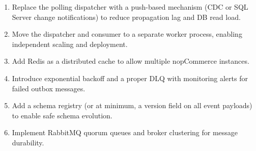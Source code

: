 \begin{enumerate}
    \item Replace the polling dispatcher with a push-based mechanism (CDC or SQL Server change notifications) to reduce propagation lag and DB read load.
    \item Move the dispatcher and consumer to a separate worker process, enabling independent scaling and deployment.
    \item Add Redis as a distributed cache to allow multiple nopCommerce instances.
    \item Introduce exponential backoff and a proper DLQ with monitoring alerts for failed outbox messages.
    \item Add a schema registry (or at minimum, a version field on all event payloads) to enable safe schema evolution.
    \item Implement RabbitMQ quorum queues and broker clustering for message durability.
\end{enumerate}
